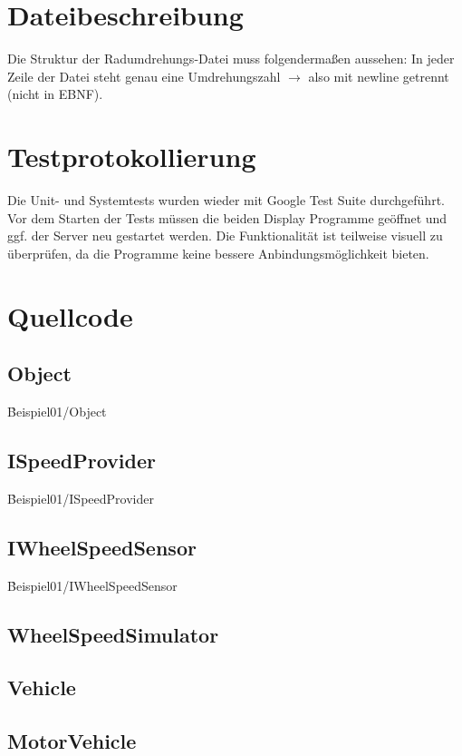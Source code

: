 \section{Dateibeschreibung}

Die Struktur der Radumdrehungs-Datei muss folgendermaßen aussehen:
In jeder Zeile der Datei steht genau eine Umdrehungszahl $\rightarrow$ also mit newline getrennt (nicht in EBNF).

\section{Testprotokollierung}
Die Unit- und Systemtests wurden wieder mit Google Test Suite durchgeführt. Vor dem Starten der Tests müssen die beiden Display Programme geöffnet und ggf. der Server neu gestartet werden. Die Funktionalität ist teilweise visuell zu überprüfen, da die Programme keine bessere Anbindungsmöglichkeit bieten.


\section{Quellcode}
\subsection{Object}
\h{Beispiel01/Object}

\subsection{ISpeedProvider}
\h{Beispiel01/ISpeedProvider}

\subsection{IWheelSpeedSensor}
\h{Beispiel01/IWheelSpeedSensor}

\subsection{WheelSpeedSimulator}

\subsection{Vehicle}

\subsection{MotorVehicle}

